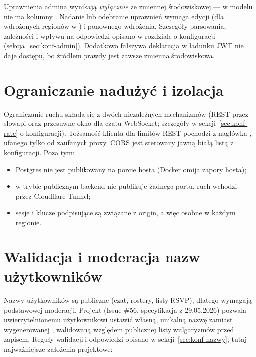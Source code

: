 Uprawnienia admina wynikają \emph{wyłącznie} ze zmiennej środowiskowej
 --- w modelu  nie ma kolumny . Nadanie
lub odebranie uprawnień wymaga edycji  (dla wdrożonych regionów w
) i ponownego wdrożenia. Szczegóły parsowania, zależności
 i wpływu na odpowiedzi opisano w rozdziale o konfiguracji
(sekcja~\ref{sec:konf-admin}). Dodatkowo fałszywa deklaracja  w ładunku
JWT nie daje dostępu, bo źródłem prawdy jest zawsze zmienna środowiskowa.

\section{Ograniczanie nadużyć i izolacja}
\label{sec:tozs-limity}

Ograniczanie ruchu składa się z dwóch niezależnych mechanizmów (REST przez slowapi oraz
przesuwne okno dla czatu WebSocket; szczegóły w sekcji~\ref{sec:konf-rate} o
konfiguracji). Tożsamość klienta dla limitów REST pochodzi z nagłówka
, ufanego tylko od zaufanych proxy. CORS jest sterowany jawną
białą listą z konfiguracji. Poza tym:

\begin{itemize}
  \item Postgres nie jest publikowany na porcie hosta (Docker omija zapory hosta);
  \item w trybie publicznym backend nie publikuje żadnego portu, ruch wchodzi przez
        Cloudflare Tunnel;
  \item sesje i klucze podpisujące są związane z origin, a więc osobne w każdym regionie.
\end{itemize}

\section{Walidacja i moderacja nazw użytkowników}
\label{sec:tozs-nazwy}

Nazwy użytkowników są publiczne (czat, rostery, listy RSVP), dlatego wymagają podstawowej
moderacji. Projekt (Issue \#56, specyfikacja z 29.05.2026) pozwala uwierzytelnionemu
użytkownikowi ustawić własną, unikalną nazwę zamiast wygenerowanej ,
walidowaną względem publicznej listy wulgaryzmów przed zapisem. Reguły walidacji i
odpowiedzi  opisano w sekcji~\ref{sec:konf-nazwy}; tutaj
najważniejsze założenia projektowe:

